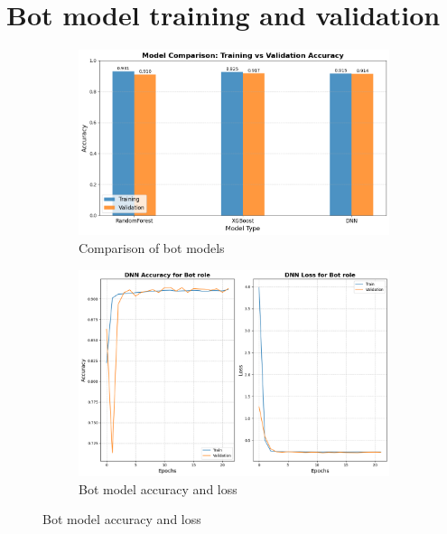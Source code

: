 \documentclass[12pt, a4paper]{article}
\begin{document}
\section{Bot model training and validation}\label{sec:bot_model_training}
\begin{figure}[!ht]
    \centering
    \begin{subfigure}[b]{0.8\textwidth}
        \centering
        \includegraphics[width=\textwidth]{figures/2_bot_model_comparison.png}
        \caption{Comparison of bot models}
    \end{subfigure}
    \begin{subfigure}[b]{0.8\textwidth}
        \centering
        \includegraphics[width=\textwidth]{figures/2_bot_model_acc_loss.png}
        \caption{Bot model accuracy and loss}
    \end{subfigure}
\end{figure}

\clearpage
\end{document}
